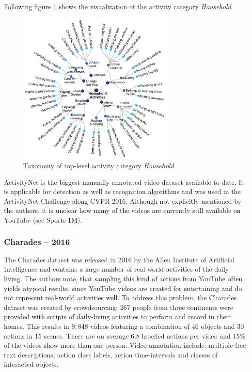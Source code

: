Following figure \ref{fig:activitynet_taxonomy} shows the visualization of the activity category \textit{Household}.
\begin{figure}[H]
    \centering
    \includegraphics[width=0.7\textwidth]{img_datasets/activitynet_taxonomy}
    \caption{Taxonomy of top-level activity category \textit{Household} \cite{caba_heilbron_activitynet:_2015}}
    \label{fig:activitynet_taxonomy}
\end{figure}

ActivityNet is the biggest manually annotated video-dataset available to date.
It is applicable for detection as well as recognition algorithms and was used in the ActivityNet Challenge along CVPR 2016.
Although not explicitly mentioned by the authors, it is unclear how many of the videos are currently still available on YouTube (see Sports-1M).

\subsubsection{Charades -- 2016}
The Charades dataset \cite{sigurdsson_hollywood_2016} was released in 2016 by the Allen Institute of Artificial Intelligence and contains a large number of real-world activities of the daily living.
The authors note, that sampling this kind of actions from YouTube often yields atypical results, since YouTube videos are created for entertaining and do not represent real-world activities well.
To address this problem, the Charades dataset was created by crowdsourcing: 267 people from three continents were provided with scripts of daily-living activities to perform and record in their homes.
This results in $9,848$ videos featuring a combination of 46 objects and 30 actions in 15 scenes.
There are on average $6.8$ labelled actions per video and 15\% of the videos show more than one person.
Video annotation include: multiple free-text descriptions, action class labels, action time-intervals and classes of interacted objects.

